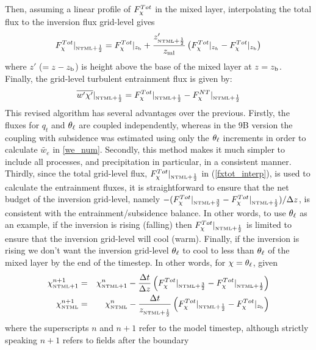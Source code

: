 \documentclass{UMDP_article}
\begin{document}
Then, assuming a linear profile of $F_{\chi}^{Tot}$ in the mixed layer,
interpolating the total flux to the inversion flux grid-level gives
\begin{equation}
  F_{\chi}^{Tot}|_{ \mbox{\tiny \rm NTML}+\frac{1}{2} } = F_{\chi}^{Tot}|_{z_{\rm b}} + 
  \frac{ z'_{\mbox{\tiny \rm NTML}+\frac{1}{2}} }{z_{\rm ml}} 
  \left( F_{\chi}^{Tot}|_{z_h} - F_{\chi}^{Tot}|_{z_{\rm b}} \right)
  \label{fxtot_interp}
\end{equation}
where $z'$ ($=z-z_{\rm b}$) is height above the base of the mixed layer
at $z=z_{\rm b}$.  Finally, the grid-level turbulent entrainment flux is
given by:
\begin{equation}
  \overline{w'\chi'}|_{ \mbox{\tiny \rm NTML}+\frac{1}{2} } = F_{\chi}^{Tot}|_{ \mbox{\tiny \rm NTML}+\frac{1}{2} } 
                       - F_{\chi}^{NT}|_{ \mbox{\tiny \rm NTML}+\frac{1}{2} }
  \label{rev_entflux}
\end{equation}
This revised algorithm has several advantages over the previous.
Firstly, the fluxes for $q_t$ and $\theta_{\ell}$ are coupled independently,
whereas in the 9B version the coupling with subsidence was estimated
using only the $\theta_{\ell}$ increments in order to calculate
$\tilde{w_e}$ in \ref{we_num}.  Secondly, this method makes it much
simpler to include all processes, and precipitation in particular, in
a consistent manner.  Thirdly, since the total grid-level flux,
$F_{\chi}^{Tot}|_{\mbox{\tiny \rm NTML}+\frac{1}{2}}$ in (\ref{fxtot_interp}), is used to
calculate the entrainment fluxes, it is straightforward to ensure that
the net budget of the inversion grid-level, namely $- (
F_{\chi}^{Tot}|_{\mbox{\tiny \rm NTML}+\frac{3}{2}} - F_{\chi}^{Tot}|_{\mbox{\tiny \rm NTML}+\frac{1}{2}})/\Delta z $,
is consistent with the entrainment/subsidence balance.  In other
words, to use $\theta_{\ell}$ as an example, if the inversion is rising
(falling) then $F_{\chi}^{Tot}|_{\mbox{\tiny \rm NTML}+\frac{1}{2}}$ is limited to ensure that
the inversion grid-level will cool (warm).  Finally, if the inversion
is rising we don't want the inversion grid-level $\theta_{\ell}$ to cool to
less than $\theta_{\ell}$ of the mixed layer by the end of the timestep.  In
other words, for $\chi=\theta_{\ell}$, given
\begin{eqnarray*}
  \chi_{\mbox{\tiny \rm NTML}+1}^{n+1} & =& \chi_{\mbox{\tiny \rm NTML}+1}^{n}
  - \frac{\Delta t}{\Delta z} \left(
    F_{\chi}^{Tot}|_{ \mbox{\tiny \rm NTML}+\frac{3}{2} } -  F_{\chi}^{Tot}|_{ \mbox{\tiny \rm NTML}+\frac{1}{2} } 
  \right) \\
  \chi_{\mbox{\tiny \rm NTML}}^{n+1} & =& \chi_{\mbox{\tiny \rm NTML}}^{n}
  - \frac{\Delta t}{z_{\mbox{\tiny \rm NTML}+\frac{1}{2}}} \left(
    F_{\chi}^{Tot}|_{ \mbox{\tiny \rm NTML}+\frac{1}{2} } -  F_{\chi}^{Tot}|_{z_{\rm b}} 
  \right) \\
\end{eqnarray*}
where the superscripts $n$ and $n+1$ refer to the model timestep,
although strictly speaking $n+1$ refers to fields after the boundary
\end{document}

